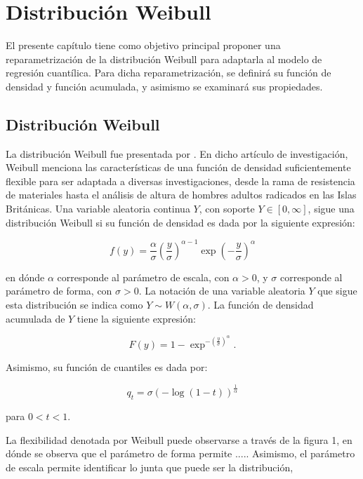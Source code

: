 \chapter{Distribución Weibull}

El presente capítulo tiene como objetivo principal proponer una reparametrización de la distribución Weibull para adaptarla al modelo de regresión cuantílica. Para dicha reparametrización, se definirá su función de densidad y función acumulada, y asimismo se examinará sus propiedades.

\section{Distribución Weibull}

La distribución Weibull fue presentada por \cite{weib:weib}. En dicho artículo de investigación, Weibull menciona las características de una función de densidad suficientemente flexible para ser adaptada a diversas investigaciones, desde la rama de resistencia de materiales hasta el análisis de altura de hombres adultos radicados en las Islas Británicas. Una variable aleatoria continua $Y$, con soporte $Y \in [0,\infty]$, sigue una distribución Weibull si su función de densidad es dada por la siguiente expresión:

\begin{equation*}
f{(y)}= \frac{\alpha}{\sigma}\left(\frac{y}{\sigma}\right)^{\alpha-1} \exp{\left(-\frac{y}{\sigma}\right)^{\alpha}}
\end{equation*}

\noindent en dónde $\alpha$ corresponde al parámetro de escala, con $\alpha > 0$, y $\sigma$ corresponde al parámetro de forma, con $\sigma > 0$. La notación de una variable aleatoria $Y$ que sigue esta distribución se indica como $Y \sim W(\alpha,\sigma)$. La función de densidad acumulada de $Y$ tiene la siguiente expresión:

\[F{(y)}=1-\exp^{-{(\frac{y}{\sigma})}^{\alpha}}.\]

\noindent Asimismo, su función de cuantiles es dada por:

\[q_{t}=\sigma{(-\log{(1-t)})}^{\frac{1}{\alpha}}\]

\noindent para $0 < t < 1$.

La flexibilidad denotada por Weibull puede observarse a través de la figura 1, en dónde se observa que el parámetro de forma permite ..... Asimismo, el parámetro de escala permite identificar lo junta que puede ser la distribución,

